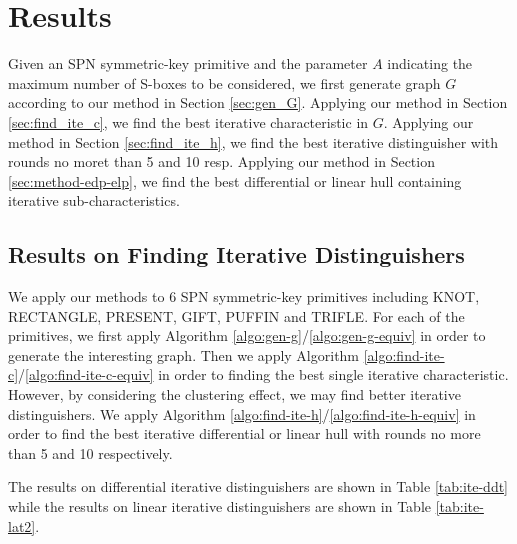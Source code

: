 \section{Results}\label{sec:result}

Given an SPN symmetric-key primitive and the parameter $A$ indicating the maximum number of S-boxes to be considered, we first generate graph $G$ according to our method in Section \ref{sec:gen_G}. Applying our method in Section \ref{sec:find_ite_c}, we find the best iterative characteristic in $G$. Applying our method in Section \ref{sec:find_ite_h}, we find the best iterative distinguisher with rounds no moret than 5 and 10 resp. Applying our method in Section \ref{sec:method-edp-elp}, we find the best differential or linear hull containing iterative sub-characteristics. 


\subsection{Results on Finding Iterative Distinguishers}

We apply our methods to 6 SPN symmetric-key primitives including KNOT\cite{zhang2019knot}, RECTANGLE\cite{zhang2015rectangle}, PRESENT\cite{bogdanov2007present}, GIFT\cite{banik2017gift}, PUFFIN\cite{cheng2008puffin} and TRIFLE\cite{Datta2019trifle}. For each of the primitives, we first apply Algorithm \ref{algo:gen-g}/\ref{algo:gen-g-equiv} in order to generate the interesting graph. Then we apply Algorithm \ref{algo:find-ite-c}/\ref{algo:find-ite-c-equiv} in order to finding the best single iterative characteristic. However, by considering the clustering effect, we may find better iterative distinguishers. We apply Algorithm \ref{algo:find-ite-h}/\ref{algo:find-ite-h-equiv} in order to find the best iterative differential or linear hull with rounds no more than 5 and 10 respectively. 

The results on differential iterative distinguishers are shown in Table \ref{tab:ite-ddt} while the results on linear iterative distinguishers are shown in Table \ref{tab:ite-lat2}. 

